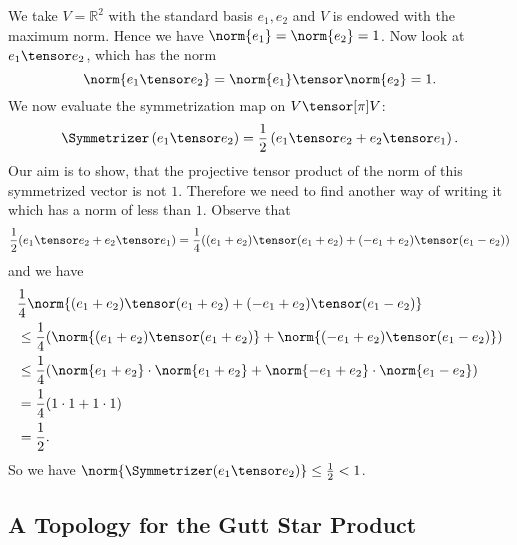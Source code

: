 \begin{example}
	We take $V = \mathbb{R}^2$ with the standard basis $e_1,	e_2$ 
	and $V$ is endowed with the maximum norm. Hence we have $\norm{e_1} = 
	\norm{e_2} = 1$. Now look at $e_1 \tensor e_2$, which has the norm
	\begin{equation*}
		\norm{
			e_1 \tensor e_2
		}
		= 
		\norm{e_1}
		\tensor
		\norm{e_2}
		=
		1.
	\end{equation*}
	We now evaluate the symmetrization map on $V \tensor[\pi] V$:
	\begin{equation*}
		\Symmetrizer \left(
			e_1 \tensor e_2
		\right)
		=
		\frac{1}{2}
		\left(
			e_1 \tensor e_2
			+
			e_2 \tensor e_1
		\right).
	\end{equation*}
	Our aim is to show, that the projective tensor product of the norm of this 
	symmetrized vector is not $1$. Therefore we need to find another way of 
	writing it which has a norm of less than $1$. Observe that
	\begin{equation*}
		\frac{1}{2}
		(e_1 \tensor e_2 + e_2 \tensor e_1)
		=
		\frac{1}{4}
		(
			(e_1 + e_2) \tensor (e_1 + e_2)
			+
			(-e_1 + e_2) \tensor (e_1 - e_2)
		)
	\end{equation*}
	and we have
	\begin{align*}
		& 
		\frac{1}{4}
		\norm{
			(e_1 + e_2) \tensor (e_1 + e_2)
			+
			(-e_1 + e_2) \tensor (e_1 - e_2)
		}
		\\
		& \leq
		\frac{1}{4}
		(
			\norm{ (e_1 + e_2) \tensor (e_1 + e_2) }
			+
			\norm{ (-e_1 + e_2) \tensor (e_1 - e_2) }
		)
		\\
		& \leq
		\frac{1}{4}
		(
			\norm{e_1 + e_2}
			\cdot
			\norm{e_1 + e_2}
			+
			\norm{- e_1 + e_2}
			\cdot
			\norm{e_1 - e_2}
		)
		\\
		& =
		\frac{1}{4}
		(1 \cdot 1 + 1 \cdot 1)
		\\
		& =
		\frac{1}{2}.
	\end{align*}
	So we have $\norm{\Symmetrizer(e_1 \tensor e_2)} \leq \frac{1}{2} < 1$.
\end{example}


\subsection{A Topology for the Gutt Star Product}

